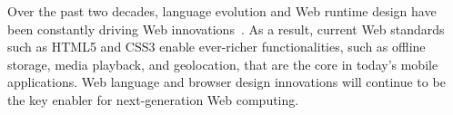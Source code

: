 Over the past two decades, language evolution and Web runtime design have been constantly driving Web  innovations~\cite{webevolution,html5evolution}. As a result, current Web standards such as HTML5 and CSS3 enable ever-richer functionalities, such as offline storage, media playback, and geolocation, that are the core in today's mobile applications. Web language and browser design innovations will continue to be the key enabler for next-generation Web computing.

